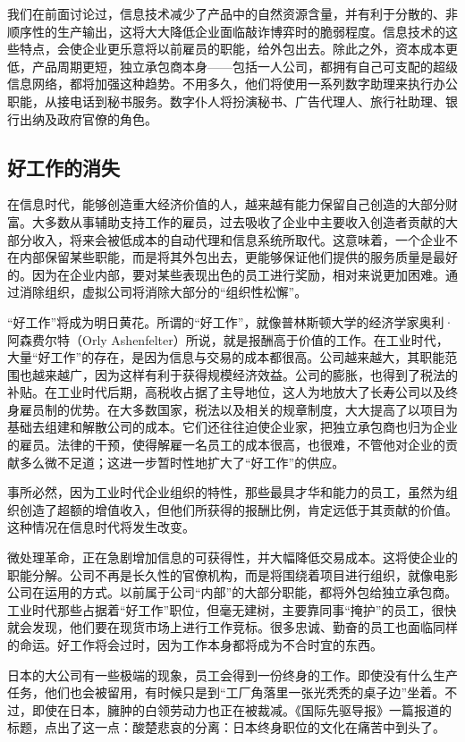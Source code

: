我们在前面讨论过，信息技术减少了产品中的自然资源含量，并有利于分散的、非顺序性的生产输出，这将大大降低企业面临敲诈博弈时的脆弱程度。信息技术的这些特点，会使企业更乐意将以前雇员的职能，给外包出去。除此之外，资本成本更低，产品周期更短，独立承包商本身——包括一人公司，都拥有自己可支配的超级信息网络，都将加强这种趋势。不用多久，他们将使用一系列数字助理来执行办公职能，从接电话到秘书服务。数字仆人将扮演秘书、广告代理人、旅行社助理、银行出纳及政府官僚的角色。

\subsection{好工作的消失}
在信息时代，能够创造重大经济价值的人，越来越有能力保留自己创造的大部分财富。大多数从事辅助支持工作的雇员，过去吸收了企业中主要收入创造者贡献的大部分收入，将来会被低成本的自动代理和信息系统所取代。这意味着，一个企业不在内部保留某些职能，而是将其外包出去，更能够保证他们提供的服务质量是最好的。因为在企业内部，要对某些表现出色的员工进行奖励，相对来说更加困难。通过消除组织，虚拟公司将消除大部分的“组织性松懈”。

“好工作”将成为明日黄花。所谓的“好工作”，就像普林斯顿大学的经济学家奥利·阿森费尔特（Orly Ashenfelter）所说，就是报酬高于价值的工作。在工业时代，大量“好工作”的存在，是因为信息与交易的成本都很高。公司越来越大，其职能范围也越来越广，因为这样有利于获得规模经济效益。公司的膨胀，也得到了税法的补贴。在工业时代后期，高税收占据了主导地位，这人为地放大了长寿公司以及终身雇员制的优势。在大多数国家，税法以及相关的规章制度，大大提高了以项目为基础去组建和解散公司的成本。它们还往往迫使企业家，把独立承包商也归为企业的雇员。法律的干预，使得解雇一名员工的成本很高，也很难，不管他对企业的贡献多么微不足道；这进一步暂时性地扩大了“好工作”的供应。

事所必然，因为工业时代企业组织的特性，那些最具才华和能力的员工，虽然为组织创造了超额的增值收入，但他们所获得的报酬比例，肯定远低于其贡献的价值。这种情况在信息时代将发生改变。

微处理革命，正在急剧增加信息的可获得性，并大幅降低交易成本。这将使企业的职能分解。公司不再是长久性的官僚机构，而是将围绕着项目进行组织，就像电影公司在运用的方式。以前属于公司“内部”的大部分职能，都将外包给独立承包商。工业时代那些占据着“好工作”职位，但毫无建树，主要靠同事“掩护”的员工，很快就会发现，他们要在现货市场上进行工作竞标。很多忠诚、勤奋的员工也面临同样的命运。好工作将会过时，因为工作本身都将成为不合时宜的东西。

日本的大公司有一些极端的现象，员工会得到一份终身的工作。即使没有什么生产任务，他们也会被留用，有时候只是到“工厂角落里一张光秃秃的桌子边”坐着。不过，即使在日本，臃肿的白领劳动力也正在被裁减。《国际先驱导报》一篇报道的标题，点出了这一点：酸楚悲哀的分离：日本终身职位的文化在痛苦中到头了。

